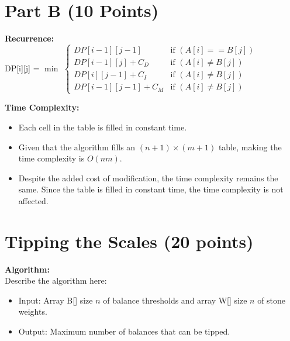 \documentclass{article}[12pt]
\begin{document}
\newpage
\section{Part B (10 Points)}
\noindent\textbf{Recurrence:} \\
DP[i][j] = $\min$
$\begin{cases}
  DP[i-1][j-1] & \text{if } (A[i] == B[j])\\
  DP[i-1][j] + C_D & \text{if } (A[i] \neq B[j])\\
  DP[i][j-1] + C_I & \text{if } (A[i] \neq B[j])\\
  DP[i-1][j-1] + C_M & \text{if } (A[i] \neq B[j])
\end{cases}$

\noindent\textbf{Time Complexity:} \\
\begin{itemize}
  \item Each cell in the table is filled in constant time.
  \item Given that the algorithm fills an $(n+1) \times (m+1)$ table, 
    making the time complexity is $O(nm)$.
  \item Despite the added cost of modification, the time complexity remains the same.
    Since the table is filled in constant time, the time complexity is not affected.
\end{itemize}

\newpage
\section{Tipping the Scales (20 points)}
\noindent\textbf{Algorithm:} \\
Describe the algorithm here: \\
\begin{itemize}
  \item Input: Array B[] size $n$ of balance thresholds and array W[] size $n$ of stone weights.
  \item Output: Maximum number of balances that can be tipped.
\end{itemize}
\end{document}
